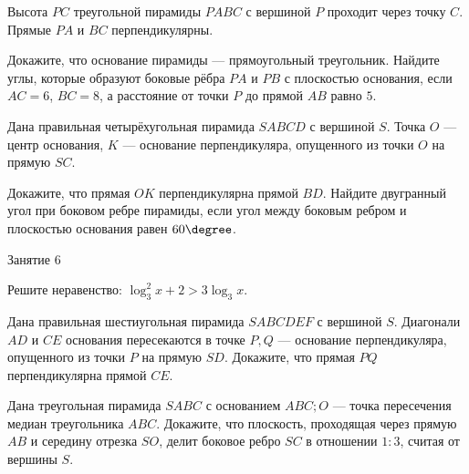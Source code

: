 \begin{class}[number=5]
	\begin{listofex}
		\item Высота \(PC\) треугольной пирамиды \(PABC\) с вершиной \(P\) проходит через точку \(C\). Прямые \(PA\) и \(BC\) перпендикулярны.
		\begin{tasks}
			\task Докажите, что основание пирамиды --- прямоугольный треугольник.
			\task Найдите углы, которые образуют боковые рёбра \(PA\) и \(PB\) с плоскостью основания, если \(AC = 6\), \(BC = 8\), а расстояние от точки \(P\) до прямой \(AB\) равно \(5\).
		\end{tasks}
		\item Дана правильная четырёхугольная пирамида \(SABCD\) с вершиной \(S\). Точка \(O\) --- центр основания, \(K\) --- основание перпендикуляра, опущенного из точки \(O\) на прямую \(SC\).
		\begin{tasks}
			\task Докажите, что прямая \(OK\) перпендикулярна прямой \(BD\).
			\task Найдите двугранный угол при боковом ребре пирамиды, если угол между боковым ребром и плоскостью основания равен \(60\degree \).
		\end{tasks}
	\end{listofex}
\end{class}

\begin{class}[number=6]
	\begin{listofex}
		\item Занятие 6
	\end{listofex}
\end{class}

\begin{homework}[number=3]
	\begin{listofex}
		\item Решите неравенство: \( \log_3^2 x + 2 > 3\log_3 x \).
		\item Дана правильная шестиугольная пирамида \(SABCDEF\) с вершиной \(S\). Диагонали \(AD\) и \(CE\) основания пересекаются в точке \(P, Q\) --- основание перпендикуляра, опущенного из точки \(P\) на прямую \(SD\). Докажите, что прямая \(PQ\) перпендикулярна прямой \(CE\).
		\item Дана треугольная пирамида \(SABC\) с основанием \(ABC; O\) --- точка пересечения медиан треугольника \(ABC\). Докажите, что плоскость, проходящая через прямую \(AB\) и середину отрезка \(SO\), делит боковое ребро \(SC\) в отношении \(1 : 3\), считая от вершины \(S\).
	\end{listofex}
\end{homework}

